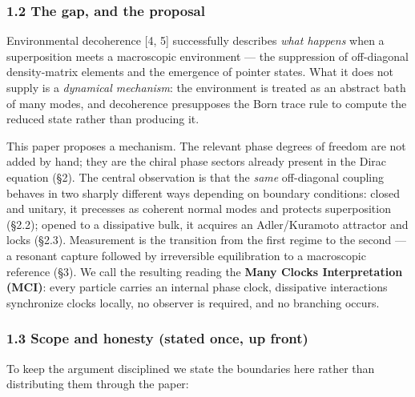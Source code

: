 \documentclass[
]{article}
\begin{document}
\subsubsection{1.2 The gap, and the
proposal}\label{the-gap-and-the-proposal}

Environmental decoherence {[}4, 5{]} successfully describes \emph{what
happens} when a superposition meets a macroscopic environment --- the
suppression of off-diagonal density-matrix elements and the emergence of
pointer states. What it does not supply is a \emph{dynamical mechanism}:
the environment is treated as an abstract bath of many modes, and
decoherence presupposes the Born trace rule to compute the reduced state
rather than producing it.

This paper proposes a mechanism. The relevant phase degrees of freedom
are not added by hand; they are the chiral phase sectors already present
in the Dirac equation (§2). The central observation is that the
\emph{same} off-diagonal coupling behaves in two sharply different ways
depending on boundary conditions: closed and unitary, it precesses as
coherent normal modes and protects superposition (§2.2); opened to a
dissipative bulk, it acquires an Adler/Kuramoto attractor and locks
(§2.3). Measurement is the transition from the first regime to the
second --- a resonant capture followed by irreversible equilibration to
a macroscopic reference (§3). We call the resulting reading the
\textbf{Many Clocks Interpretation (MCI)}: every particle carries an
internal phase clock, dissipative interactions synchronize clocks
locally, no observer is required, and no branching occurs.

\subsubsection{1.3 Scope and honesty (stated once, up
front)}\label{scope-and-honesty-stated-once-up-front}

To keep the argument disciplined we state the boundaries here rather
than distributing them through the paper:
\end{document}
